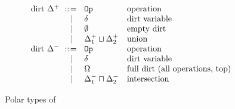 \begin{figure}[!htb]
\begin{center}
{\begin{minipage}{0.98\columnwidth}
\[\begin{array}{r@{~}c@{~}l@{\quad}l}
    \text{dirt}~\dirt^+ & \bnfis {} & \op & \text{operation} \\
    & \bnfor & \delta & \text{dirt variable} \\
    & \bnfor & \emptyrow & \text{empty dirt} \\
    & \bnfor & \dirt_1^+ \union \dirt_2^+ & \text{union} \\

    \text{dirt}~\dirt^- & \bnfis {} & \op & \text{operation} \\
    & \bnfor & \delta & \text{dirt variable} \\
    & \bnfor & \allops & \text{full dirt (all operations, top)} \\
    & \bnfor & \dirt_1^- \intersection \dirt_2^- & \text{intersection}
\end{array}\]
\end{minipage}
}
\end{center}
\caption{Polar types of \core}\label{fig:types:core:polar}
\end{figure}
    